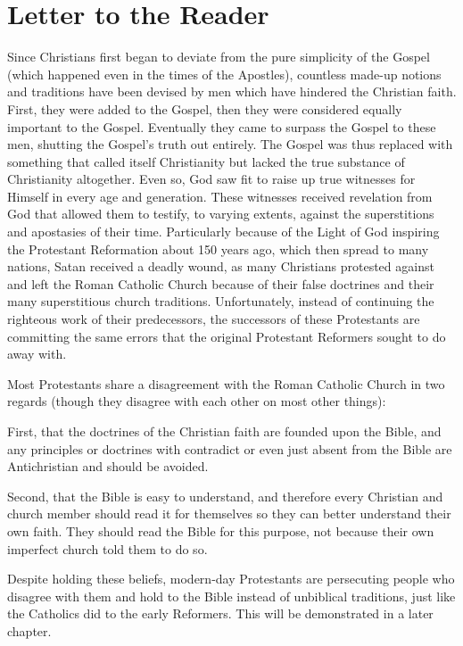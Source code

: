 \documentclass[../main.tex]{subfiles}
\begin{document}
	

	\section*{Letter to the Reader}
	Since Christians first began to deviate from the pure simplicity of the Gospel (which happened even in the times of the Apostles), countless made-up notions and traditions have been devised by men which have hindered the Christian faith. First, they were added to the Gospel, then they were considered equally important to the Gospel. Eventually they came to surpass the Gospel to these men, shutting the Gospel's truth out entirely. The Gospel was thus replaced with something that called itself Christianity but lacked the true substance of Christianity altogether. Even so, God saw fit to raise up true witnesses for Himself in every age and generation. These witnesses received revelation from God that allowed them to testify, to varying extents, against the superstitions and apostasies of their time. Particularly because of the Light of God inspiring the Protestant Reformation about 150 years ago, which then spread to many nations, Satan received a deadly wound, as many Christians protested against and left the Roman Catholic Church because of their false doctrines and their many superstitious church traditions. Unfortunately, instead of continuing the righteous work of their predecessors, the successors of these Protestants are committing the same errors that the original Protestant Reformers sought to do away with.
	
	Most Protestants share a disagreement with the Roman Catholic Church in two regards (though they disagree with each other on most other things):
	
	First, that the doctrines of the Christian faith are founded upon the Bible, and any principles or doctrines with contradict or even just absent from the Bible are Antichristian and should be avoided.
	
	Second, that the Bible is easy to understand, and therefore every Christian and church member should read it for themselves so they can better understand their own faith. They should read the Bible for this purpose, not because their own imperfect church told them to do so.
	
	Despite holding these beliefs, modern-day Protestants are persecuting people who disagree with them and hold to the Bible instead of unbiblical traditions, just like the Catholics did to the early Reformers. This will be demonstrated in a later chapter.
	
\end{document}
